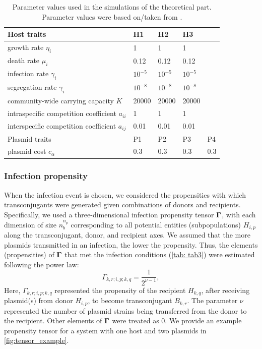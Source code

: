 \documentclass[10pt,letterpaper]{article}
\begin{document}
\begin{table}[!ht]
\centering\captionsetup{font=footnotesize}
\begin{center}
 \caption{Parameter values used in the simulations of the theoretical part. Parameter values were based on/taken from \cite{Harrison2015-zl}.}\label{tab: tab2}
 \begin{tabular}{@{}lllll@{}}
 \toprule
Host traits & H1 & H2 & H3 \\
 \midrule
    growth rate $\eta_i$ & 1 & 1 & 1 \\
    death rate $\mu_i$ & 0.12 & 0.12 & 0.12 \\
    infection rate $\gamma_i$ & $10^{-5}$ & $10^{-5}$ & $10^{-5}$ \\
    segregation rate $\gamma_i$ & $10^{-8}$ & $10^{-8}$ & $10^{-8}$ \\
    community-wide carrying capacity $K$ & 20000 & 20000 & 20000 \\
    intraspecific competition coefficient $a_{ii}$ & 1 & 1 & 1 \\
    interspecific competition coefficient $a_{ij}$ & 0.01 & 0.01 & 0.01 \\
    \midrule
Plasmid traits & P1 & P2 & P3 & P4 \\
\midrule
    plasmid cost $c_{\alpha}$ & 0.3 & 0.3 & 0.3 & 0.3 \\
 \bottomrule
\end{tabular}%
\end{center}
\end{table}

\subsubsection*{Infection propensity} When the infection event is chosen, we considered the propensities with which transconjugants were generated given combinations of donors and recipients. Specifically, we used a three-dimensional infection propensity tensor $\vb*{\Gamma}$, with each dimension of size $n_b^{n_p}$ corresponding to all potential entities (subpopulations) $H_{i,p}$ along the transconjugant, donor, and recipient axes. We assumed that the more plasmids transmitted in an infection, the lower the propensity. Thus, the elements (propensities) of $\vb*{\Gamma}$ that met the infection conditions (\cref{tab: tab3}) were estimated following the power law:
\begin{equation}
     \Gamma_{k,r;i,p;k,q} = \frac{1}{2^{\nu-1}} ,\label{eq1}
\end{equation}
Here, $\Gamma_{k,r;i,p;k,q}$ represented the propensity of the recipient $H_{k,q}$, after receiving plasmid(s) from donor $H_{i,p}$, to become transconjugant $B_{k,r}$. The parameter $\nu$ represented the number of plasmid strains being transferred from the donor to the recipient. Other elements of $\vb*{\Gamma}$ were treated as 0. We provide an example propensity tensor for a system with one host and two plasmids in \cref{fig:tensor_example}.
\end{document}

